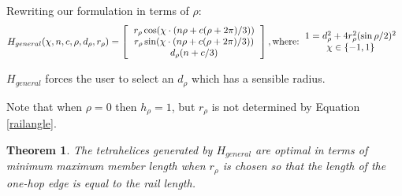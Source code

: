 \documentclass[11pt]{article}
\newtheorem{theorem}{Theorem}
\begin{document}
Rewriting our formulation in terms of $\rho$:
\begin{equation}
  \label{eq:general}
H_{general}(\chi,n,c,\rho,d_{\rho},r_{\rho}) =
\left [
  \begin{tabular}{c}
   $ r_{\rho} \cos(\chi \cdot (n \rho + c(\rho +  2 \pi) /3)) $\\
   $ r_{\rho}  \sin(\chi \cdot (n \rho + c(\rho +  2 \pi) /3)) $\\
   $ d_{\rho} (n + c /3) $
  \end{tabular}
  \right ],
\text{where:}
\begin{tabular}{c}
  $   1 = d_{\rho}^2 + 4 r_{\rho}^2 (\sin{ \rho / 2})^2 $ \\
    $\chi \in \{-1,1\}$ \\  
  \end{tabular}      
\end{equation}


$H_{general}$ forces the user to select an $d_{\rho}$
which has a sensible radius.

Note that when $\rho = 0$ then $h_{\rho} = 1$, but $r_{\rho}$ is not determined by
Equation \ref{railangle}.

\begin{theorem}
  \label{generalformulaoptimal}
  The tetrahelices generated by $H_{general}$ are optimal in terms of minimum maximum member length when $r_{\rho}$ is chosen so that
  the length of the one-hop edge is equal to the rail length.
\end{theorem}
\end{document}
